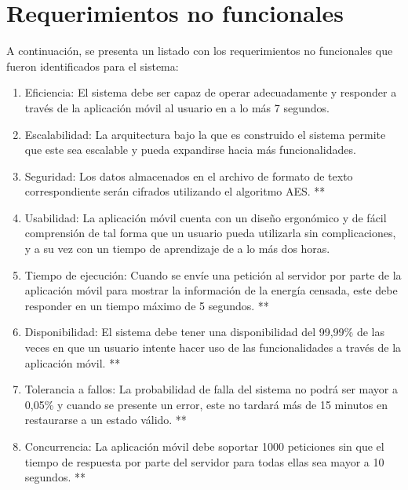 \section{Requerimientos no funcionales}
A continuación, se presenta un listado con los requerimientos no funcionales que fueron identificados para el sistema:
\begin{enumerate}[label=RNF\arabic*.]
    \item Eficiencia: El sistema debe ser capaz de operar adecuadamente y responder a través de la aplicación móvil al usuario en a lo más 7 segundos.
	\item Escalabilidad: La arquitectura bajo la que es construido el sistema permite que este sea escalable y pueda expandirse hacia más funcionalidades.
	\item Seguridad: Los datos almacenados en el archivo de formato de texto correspondiente serán cifrados utilizando el algoritmo AES. **
	\item Usabilidad: La aplicación móvil cuenta con un diseño ergonómico y de fácil comprensión de tal forma que un usuario pueda utilizarla sin complicaciones, y a su vez con un tiempo de aprendizaje de a lo más dos horas.
	\item Tiempo de ejecución: Cuando se envíe una petición al servidor por parte de la aplicación móvil para mostrar la información de la energía censada, este debe responder en un tiempo máximo de 5 segundos. **
	\item Disponibilidad: El sistema debe tener una disponibilidad del 99,99\% de las veces en que un usuario intente hacer uso de las funcionalidades a través de la aplicación móvil. **
	\item Tolerancia a fallos: La probabilidad de falla del sistema no podrá ser mayor a 0,05\% y cuando se presente un error, este no tardará más de 15 minutos en restaurarse a un estado válido. **
	\item Concurrencia: La aplicación móvil debe soportar 1000 peticiones sin que el tiempo de respuesta por parte del servidor para todas ellas sea mayor a 10 segundos. **
\end{enumerate}